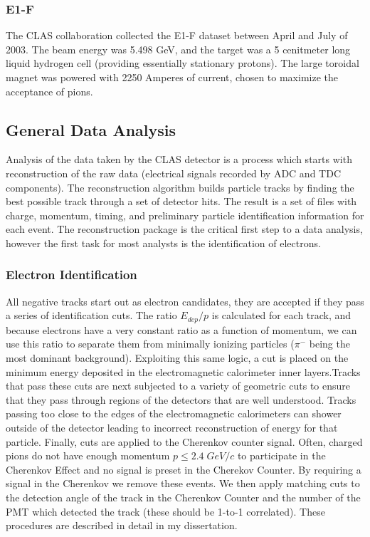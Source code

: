 \subsubsection{E1-F}
The CLAS collaboration collected the E1-F dataset between April and July of 2003.  The beam energy was 5.498 GeV, and the target was a 5 cenitmeter long liquid hydrogen cell (providing essentially stationary protons).  The large toroidal magnet was powered with 2250 Amperes of current, chosen to maximize the acceptance of pions.

\subsection{General Data Analysis}
Analysis of the data taken by the CLAS detector is a process which starts with reconstruction of the raw data (electrical signals recorded by ADC and TDC components).  The reconstruction algorithm builds particle tracks by finding the best possible track through a set of detector hits.  The result is a set of files with charge, momentum, timing, and preliminary particle identification information for each event.  The reconstruction package is the critical first step to a data analysis, however the first task for most analysts is the identification of electrons.

\subsubsection{Electron Identification}
All negative tracks start out as electron candidates, they are accepted if they pass a series of identification cuts. The ratio $E_{dep}/p$ is calculated for each track, and because electrons have a very constant ratio as a function of momentum, we can use this ratio to separate them from minimally ionizing particles ($\pi^{-}$ being the most dominant background).  Exploiting this same logic, a cut is placed on the minimum energy deposited in the electromagnetic calorimeter inner layers.Tracks that pass these cuts are next subjected to a variety of geometric cuts to ensure that they pass through regions of the detectors that are well understood.  Tracks passing too close to the edges of the electromagnetic calorimeters can shower outside of the detector leading to incorrect reconstruction of energy for that particle.  Finally, cuts are applied to the Cherenkov counter signal.  Often, charged pions do not have enough momentum $p \leq 2.4 \; GeV/c$ to participate in the Cherenkov Effect and no signal is preset in the Cherekov Counter.  By requiring a signal in the Cherenkov we remove these events.  We then apply matching cuts to the detection angle of the track in the Cherenkov Counter and the number of the PMT which detected the track (these should be 1-to-1 correlated).  These procedures are described in detail in my dissertation.

